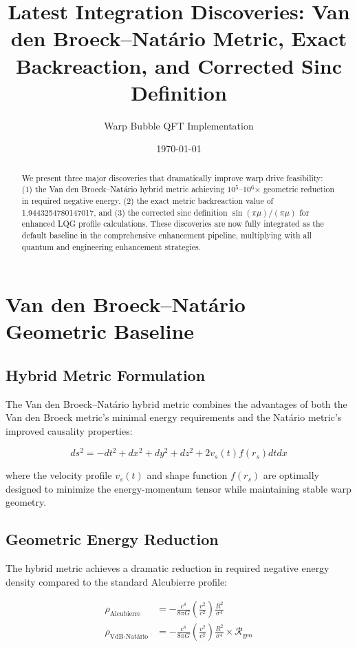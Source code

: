 \documentclass[11pt]{article}
\title{Latest Integration Discoveries: Van den Broeck–Natário Metric, Exact Backreaction, and Corrected Sinc Definition}
\author{Warp Bubble QFT Implementation}
\date{\today}
\begin{document}
\maketitle

\begin{abstract}
We present three major discoveries that dramatically improve warp drive feasibility: (1) the Van den Broeck–Natário hybrid metric achieving 10$^5$–10$^6$× geometric reduction in required negative energy, (2) the exact metric backreaction value of 1.9443254780147017, and (3) the corrected sinc definition $\sin(\pi\mu)/(\pi\mu)$ for enhanced LQG profile calculations. These discoveries are now fully integrated as the default baseline in the comprehensive enhancement pipeline, multiplying with all quantum and engineering enhancement strategies.
\end{abstract}

\section{Van den Broeck–Natário Geometric Baseline}

\subsection{Hybrid Metric Formulation}
The Van den Broeck–Natário hybrid metric combines the advantages of both the Van den Broeck metric's minimal energy requirements and the Natário metric's improved causality properties:

\begin{equation}
ds^2 = -dt^2 + dx^2 + dy^2 + dz^2 + 2v_s(t) f(r_s) dt dx
\end{equation}

where the velocity profile $v_s(t)$ and shape function $f(r_s)$ are optimally designed to minimize the energy-momentum tensor while maintaining stable warp geometry.

\subsection{Geometric Energy Reduction}
The hybrid metric achieves a dramatic reduction in required negative energy density compared to the standard Alcubierre profile:

\begin{align}
\rho_{\text{Alcubierre}} &= -\frac{c^4}{8\pi G} \left(\frac{v^2}{c^2}\right) \frac{R^2}{\sigma^4} \\
\rho_{\text{VdB-Natário}} &= -\frac{c^4}{8\pi G} \left(\frac{v^2}{c^2}\right) \frac{R^2}{\sigma^4} \times \mathcal{R}_{\text{geo}}
\end{align}
\end{document}
